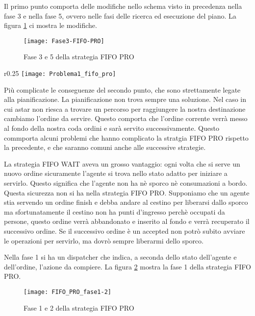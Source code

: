 Il primo punto comporta delle modifiche nello schema visto in precedenza nella fase 3 e nella fase 5, ovvero nelle fasi delle ricerca ed esecuzione del piano. La figura \ref{fig:figure3} ci mostra le modifiche.

\begin{figure}[htp]
  \texttt{[image: Fase3-FIFO-PRO]}
  \caption{Fase 3 e 5 della strategia FIFO PRO}
  \label{fig:figure3}
\end{figure}

\newpage
\begin{wrapfigure}{r}{0.25\textwidth}
    \centering
    \texttt{[image: Problema1\_fifo\_pro]}
\end{wrapfigure}

Più complicate le conseguenze del secondo punto, che sono strettamente legate alla pianificazione. La pianificazione non trova sempre una soluzione. Nel caso in cui astar non riesca a trovare un percorso per raggiungere la nostra destinazione cambiamo l'ordine da servire. Questo comporta che l'ordine corrente verrà messo al fondo della nostra coda ordini e sarà servito successivamente. Questo commporta alcuni problemi che hanno complicato la stratgia FIFO PRO rispetto la precedente, e che saranno comuni anche alle successive strategie.

La strategia FIFO WAIT aveva un grosso vantaggio: ogni volta che si serve un nuovo ordine sicuramente l'agente si trova nello stato adatto per iniziare a servirlo.
Questo significa che l'agente non ha nè sporco nè consumazioni a bordo. Questa sicurezza non si ha nella strategia FIFO PRO. Supponiamo che un agente stia servendo un ordine finish e debba andare al cestino per liberarsi dallo sporco ma sfortunatamente il cestino non ha punti d'ingresso perchè occupati da persone, questo ordine verrà abbandonato e inserito al fondo e verrà recuperato il successivo ordine. Se il successivo ordine è un accepted non potrò subito avviare le operazioni per servirlo, ma dovrò sempre liberarmi dello sporco.

Nella fase 1 si ha un dispatcher che indica, a seconda dello stato dell'agente e dell'ordine, l'azione da compiere. La figura \ref{fig:figure4} mostra la fase 1 della strategia FIFO PRO.

\begin{figure}[htp]
  \texttt{[image: FIFO\_PRO\_fase1-2]}
  \caption{Fase 1 e 2 della strategia FIFO PRO}
  \label{fig:figure4}
\end{figure}

